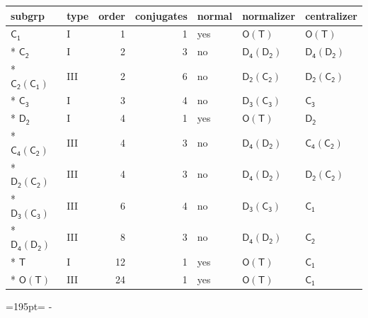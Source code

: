 \documentclass[10pt,a4paper]{article}
\newcommand{\needspace}[1]{\par\penalty-100\begingroup\dimen0=#1\relax\dimen2=\pagegoal
  \advance\dimen2-\pagetotal\ifdim\dimen0>\dimen2\relax\ifdim\dimen2>0pt\vfil\break\fi\fi
  \endgroup}
\numberwithin{equation}{section}
\newcommand{\grp}[1]{\mathsf{#1}}
\begin{document}
{\small\begin{longtable}{@{}llrrlll@{}}\toprule
subgrp & type & order & conjugates & normal & normalizer & centralizer\\\midrule\endhead
\bottomrule\endfoot\endlastfoot
\href{../../../rotation/data/pdf/C1.pdf}{$\grp{C_{1}}$} & I & 1 & 1 & yes & \href{O-T.pdf}{$\grp{O}(\grp{T})$} & \href{O-T.pdf}{$\grp{O}(\grp{T})$}\\*
\href{../../../rotation/data/pdf/C2.pdf}{$\grp{C_{2}}$} & I & 2 & 3 & no & \href{D4-D2.pdf}{$\grp{D_{4}}(\grp{D_{2}})$} & \href{D4-D2.pdf}{$\grp{D_{4}}(\grp{D_{2}})$}\\*
\href{C2-C1.pdf}{$\grp{C_{2}}(\grp{C_{1}})$} & III & 2 & 6 & no & \href{D2-C2.pdf}{$\grp{D_{2}}(\grp{C_{2}})$} & \href{D2-C2.pdf}{$\grp{D_{2}}(\grp{C_{2}})$}\\*
\href{../../../rotation/data/pdf/C3.pdf}{$\grp{C_{3}}$} & I & 3 & 4 & no & \href{D3-C3.pdf}{$\grp{D_{3}}(\grp{C_{3}})$} & \href{../../../rotation/data/pdf/C3.pdf}{$\grp{C_{3}}$}\\*
\href{../../../rotation/data/pdf/D2.pdf}{$\grp{D_{2}}$} & I & 4 & 1 & yes & \href{O-T.pdf}{$\grp{O}(\grp{T})$} & \href{../../../rotation/data/pdf/D2.pdf}{$\grp{D_{2}}$}\\*
\href{C4-C2.pdf}{$\grp{C_{4}}(\grp{C_{2}})$} & III & 4 & 3 & no & \href{D4-D2.pdf}{$\grp{D_{4}}(\grp{D_{2}})$} & \href{C4-C2.pdf}{$\grp{C_{4}}(\grp{C_{2}})$}\\*
\href{D2-C2.pdf}{$\grp{D_{2}}(\grp{C_{2}})$} & III & 4 & 3 & no & \href{D4-D2.pdf}{$\grp{D_{4}}(\grp{D_{2}})$} & \href{D2-C2.pdf}{$\grp{D_{2}}(\grp{C_{2}})$}\\*
\href{D3-C3.pdf}{$\grp{D_{3}}(\grp{C_{3}})$} & III & 6 & 4 & no & \href{D3-C3.pdf}{$\grp{D_{3}}(\grp{C_{3}})$} & \href{../../../rotation/data/pdf/C1.pdf}{$\grp{C_{1}}$}\\*
\href{D4-D2.pdf}{$\grp{D_{4}}(\grp{D_{2}})$} & III & 8 & 3 & no & \href{D4-D2.pdf}{$\grp{D_{4}}(\grp{D_{2}})$} & \href{../../../rotation/data/pdf/C2.pdf}{$\grp{C_{2}}$}\\*
\href{../../../rotation/data/pdf/T.pdf}{$\grp{T}$} & I & 12 & 1 & yes & \href{O-T.pdf}{$\grp{O}(\grp{T})$} & \href{../../../rotation/data/pdf/C1.pdf}{$\grp{C_{1}}$}\\*
\href{O-T.pdf}{$\grp{O}(\grp{T})$} & III & 24 & 1 & yes & \href{O-T.pdf}{$\grp{O}(\grp{T})$} & \href{../../../rotation/data/pdf/C1.pdf}{$\grp{C_{1}}$}\\
\bottomrule\end{longtable}}
\needspace{195pt}
\end{document}
